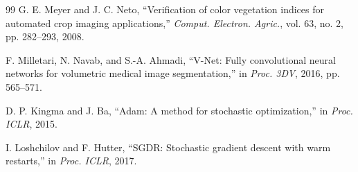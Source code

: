 \documentclass[conference]{IEEEtran}
\begin{document}
\begin{thebibliography}{99}
G. E. Meyer and J. C. Neto,
“Verification of color vegetation indices for automated crop imaging applications,”
\textit{Comput. Electron. Agric.}, vol. 63, no. 2, pp. 282--293, 2008.

F. Milletari, N. Navab, and S.-A. Ahmadi,
“V-Net: Fully convolutional neural networks for volumetric medical image segmentation,”
in \textit{Proc. 3DV}, 2016, pp. 565--571.

D. P. Kingma and J. Ba,
“Adam: A method for stochastic optimization,”
in \textit{Proc. ICLR}, 2015.

I. Loshchilov and F. Hutter,
“SGDR: Stochastic gradient descent with warm restarts,”
in \textit{Proc. ICLR}, 2017.

\end{thebibliography}
\end{document}
